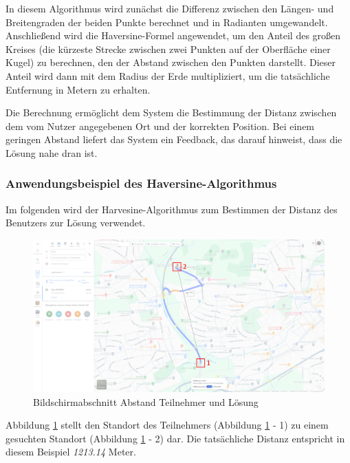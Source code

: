 In diesem Algorithmus wird zunächst die Differenz zwischen den Längen- und Breitengraden der beiden Punkte berechnet und in Radianten umgewandelt. Anschließend wird die Haversine-Formel angewendet, um den Anteil des großen Kreises (die kürzeste Strecke zwischen zwei Punkten auf der Oberfläche einer Kugel) zu berechnen, den der Abstand zwischen den Punkten darstellt. Dieser Anteil wird dann mit dem Radius der Erde multipliziert, um die tatsächliche Entfernung in Metern zu erhalten.

Die Berechnung ermöglicht dem System die Bestimmung der Distanz zwischen dem vom Nutzer angegebenen Ort und der korrekten Position. Bei einem geringen Abstand liefert das System ein Feedback, das darauf hinweist, dass die Lösung nahe dran ist.

\subsubsection{Anwendungsbeispiel des Haversine-Algorithmus}

Im folgenden wird der Harvesine-Algorithmus zum Bestimmen der Distanz des Benutzers zur Lösung verwendet.

\begin{figure}[H]
    \centering
    \includegraphics[width=\textwidth]{images/PrAr_Impl_Geolocation-Map.png}
    \caption{Bildschirmabschnitt Abstand Teilnehmer und Lösung}
    \label{fig:implementierung:geolocation_map}
\end{figure}

Abbildung \ref{fig:implementierung:geolocation_map} stellt den Standort des Teilnehmers (Abbildung \ref{fig:implementierung:geolocation_map} - 1) zu einem gesuchten Standort (Abbildung \ref{fig:implementierung:geolocation_map} - 2) dar. Die tatsächliche Distanz entspricht in diesem Beispiel \textit{1213.14} Meter.

